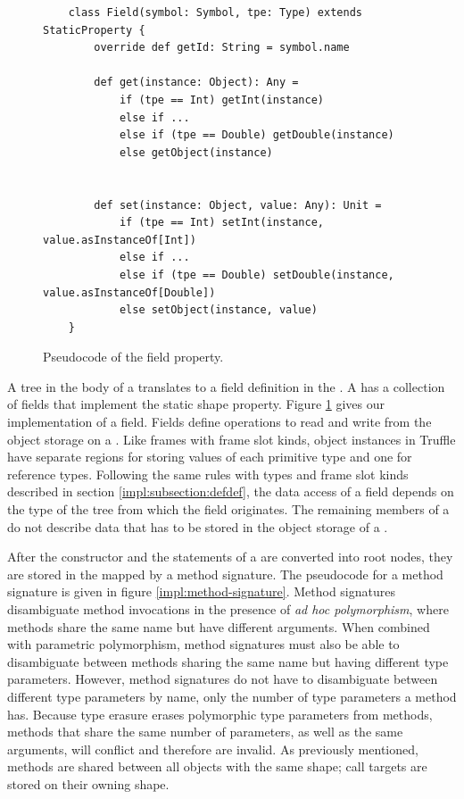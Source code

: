 \begin{figure}[!htb]
	\begin{verbatim}
	class Field(symbol: Symbol, tpe: Type) extends StaticProperty {
		override def getId: String = symbol.name
			
		def get(instance: Object): Any = 
			if (tpe == Int) getInt(instance)
			else if ...
			else if (tpe == Double) getDouble(instance)
			else getObject(instance)
	
			
		def set(instance: Object, value: Any): Unit = 
			if (tpe == Int) setInt(instance, value.asInstanceOf[Int])
			else if ...
			else if (tpe == Double) setDouble(instance, value.asInstanceOf[Double])
			else setObject(instance, value)	
	} 
	\end{verbatim}
	\caption{Pseudocode of the field property.}
	\label{impl:field}
\end{figure}

A  tree in the body of a  translates to a field definition in the .
A  has a collection of fields that implement the static shape property.
Figure \ref{impl:field} gives our implementation of a field.
Fields define operations to read and write from the object storage on a .
Like frames with frame slot kinds, object instances in Truffle have separate regions for storing values of each primitive type and one for reference types.
Following the same rules with types and frame slot kinds described in section \ref{impl:subsection:defdef}, the data access of a field depends on the type of the  tree from which the field originates.
The remaining members of a  do not describe data that has to be stored in the object storage of a .

After the constructor and the  statements of a  are converted into root nodes, they are stored in the  mapped by a method signature.
The pseudocode for a method signature is given in figure \ref{impl:method-signature}.
Method signatures disambiguate method invocations in the presence of \textit{ad hoc polymorphism}\cite{strachey:fundamental-concepts}, where methods share the same name but have different arguments.
When combined with parametric polymorphism, method signatures must also be able to disambiguate between methods sharing the same name but having different type parameters.
However, method signatures do not have to disambiguate between different type parameters by name, only the number of type parameters a method has.
Because type erasure erases polymorphic type parameters from methods, methods that share the same number of parameters, as well as the same arguments, will conflict and therefore are invalid.
As previously mentioned, methods are shared between all  objects with the same shape; call targets are stored on their owning shape.

